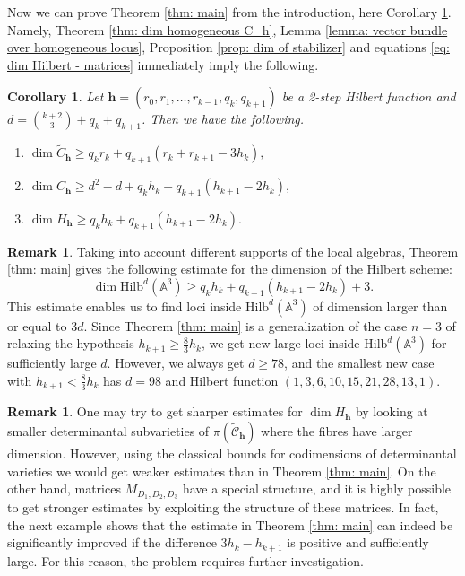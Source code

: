\documentclass[11pt]{amsart}
\newtheorem{cor}[thm]{Corollary}
\theoremstyle{definition}
\newtheorem{rmk}[thm]{Remark}
\newcommand{\A}{\mathbb{A}}
\newcommand{\Hilb}[2]{\mathrm{Hilb}^{#1}(\A^{#2})}
\newcommand{\h}{\mathbf{h}}
\newcommand{\tC}{\widetilde{C}}
\newcommand{\tcC}{\widetilde{\mathscr{C}}}
\begin{document}
Now we can prove Theorem \ref{thm: main} from the introduction, here Corollary \ref{cor: main theorem}. Namely, Theorem \ref{thm: dim homogeneous C_h}, Lemma \ref{lemma: vector bundle over homogeneous locus}, Proposition \ref{prop: dim of stabilizer} and equations \eqref{eq: dim Hilbert - matrices} immediately imply the following.

\begin{cor}\label{cor: main theorem}
Let $\h=(r_0,r_1,\ldots ,r_{k-1},q_k,q_{k+1})$ be a 2-step Hilbert function and $d={k+2\choose 3}+q_k+q_{k+1}$. Then we have the following.
\begin{enumerate}
\item
$\dim \tC_\h\ge q_kr_k+q_{k+1}(r_k+r_{k+1}-3h_k),$
\item
$\dim C_\h\ge d ^2-d+q_kh_k+q_{k+1}(h_{k+1}-2h_k),$
\item
$\dim H_\h\ge q_kh_k+q_{k+1}(h_{k+1}-2h_k).$
\end{enumerate}
\end{cor}

\begin{rmk}\label{rmk: smallest new case}
Taking into account different supports of the local algebras, Theorem \ref{thm: main} gives the following estimate for the dimension of the Hilbert scheme:
$$\dim \Hilb{d}{3}\ge q_kh_k+q_{k+1}(h_{k+1}-2h_k)+3.$$
This estimate enables us to find loci inside $\Hilb{d}{3}$ of dimension larger than or equal to $3d$. Since Theorem \ref{thm: main} is a generalization of the case $n=3$ of \cite[Corolary 3.18]{GGGL} relaxing the hypothesis $h_{k+1}\ge \frac{8}{3}h_k$, we get new large loci inside $\Hilb{d}{3}$ for sufficiently large $d$. However, we always get $d\ge 78$, and the smallest new case with $h_{k+1}<\frac{8}{3}h_k$ has $d=98$ and Hilbert function $(1,3,6,10,15,21,28,13,1)$.
\end{rmk}

\begin{rmk}
One may try to get sharper estimates for $\dim H_\h$ by looking at smaller determinantal subvarieties of $\pi(\tcC_\h)$ where the fibres have larger dimension. However, using the classical bounds for codimensions of determinantal varieties we would get weaker estimates than in Theorem \ref{thm: main}. On the other hand, matrices $M_{D_1,D_2,D_3}$ have a special structure, and it is highly possible to get stronger estimates by exploiting the structure of these matrices. In fact, the next example shows that the estimate in Theorem \ref{thm: main} can indeed be significantly improved if the difference $3h_k-h_{k+1}$ is positive and sufficiently large. For this reason, the problem requires further investigation.
\end{rmk}
\end{document}
